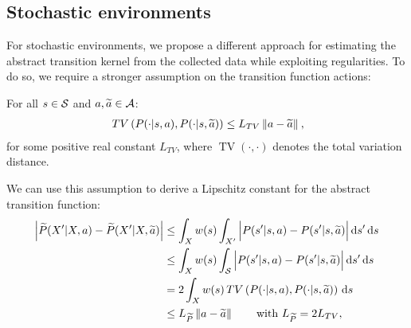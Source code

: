 \subsection{Stochastic environments}\label{sec:app2.3}
For stochastic environments, we propose a different approach for estimating the abstract transition kernel from the collected data while exploiting regularities. To do so, we require a stronger assumption on the transition function \wrt actions:
%
\begin{assumption}\label{ass:lipmdp2}
	For all $s\in\mathcal{S}$ and $a,\widetilde{a}\in\mathcal{A}$:
	\begin{align}
	&\mathop{TV}\left(P(\cdot|s,a), P(\cdot| s,\widetilde{a})\right) \leq L_{TV}\left\|a - \widetilde{a}\right\|_{}, \\
	\end{align}
	for some positive real constant $L_{TV}$, where $\mathop{TV}(\cdot,\cdot)$ denotes the total variation distance. 
\end{assumption}
%
We can use this assumption to derive a Lipschitz constant for the abstract transition function:
\begin{align}
\Big|\widetilde{P}(X'|X,a) - \widetilde{P}(X'|X,\widetilde{a})\Big| &\leq \int_{X} w(s) \int_{X'} \Big|P(s'|s,a) - P(s'|s,\widetilde{a})\Big| \,\mathrm{d} s' \,\mathrm{d} s \nonumber\\
&\leq \int_{X}w(s)\int_{\mathcal{S}} \Big|P(s'|s,a) - P(s'|s,\widetilde{a})\Big| \,\mathrm{d} s' \,\mathrm{d} s \label{p:24} \\
&= 2\int_{X}w(s)\mathop{TV}\left(P(\cdot|s,a), P(\cdot|s,\widetilde{a})\right)\,\mathrm{d} s\label{p:33}\\
&\leq L_{\widetilde{P}}\left\|a-\widetilde{a}\right\|_{}\qquad\text{with $L_{\widetilde{P}}=2L_{TV}$}\label{p:27},
\end{align}

